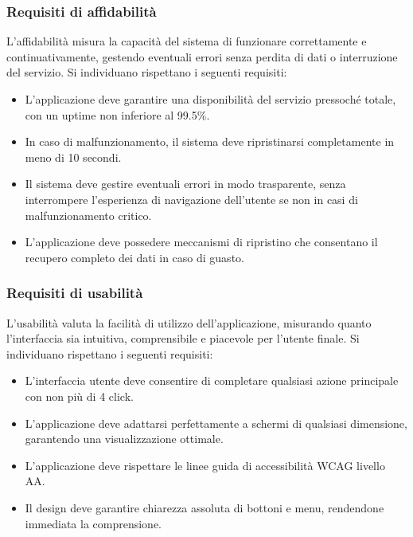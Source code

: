 \documentclass{book}
\begin{document}
\subsubsection{Requisiti di affidabilità}
L'affidabilità misura la capacità del sistema di funzionare correttamente e continuativamente, gestendo eventuali errori senza perdita di dati o interruzione del servizio. Si individuano rispettano i seguenti requisiti:
\begin{itemize}
    \item L'applicazione deve garantire una disponibilità del servizio pressoché totale, con un uptime non inferiore al 99.5\%.
    \item In caso di malfunzionamento, il sistema deve ripristinarsi completamente in meno di 10 secondi.
    \item Il sistema deve gestire eventuali errori in modo trasparente, senza interrompere l'esperienza di navigazione dell'utente se non in casi di malfunzionamento critico.
    \item L'applicazione deve possedere meccanismi di ripristino che consentano il recupero completo dei dati in caso di guasto.
\end{itemize}

\subsubsection{Requisiti di usabilità}
L'usabilità valuta la facilità di utilizzo dell'applicazione, misurando quanto l'interfaccia sia intuitiva, comprensibile e piacevole per l'utente finale. Si individuano rispettano i seguenti requisiti:
\begin{itemize}
    \item L'interfaccia utente deve consentire di completare qualsiasi azione principale con non più di 4 click.
    \item L'applicazione deve adattarsi perfettamente a schermi di qualsiasi dimensione, garantendo una visualizzazione ottimale.
    \item L'applicazione deve rispettare le linee guida di accessibilità WCAG livello AA\@.
    \item Il design deve garantire chiarezza assoluta di bottoni e menu, rendendone immediata la comprensione.
\end{itemize}
\end{document}
